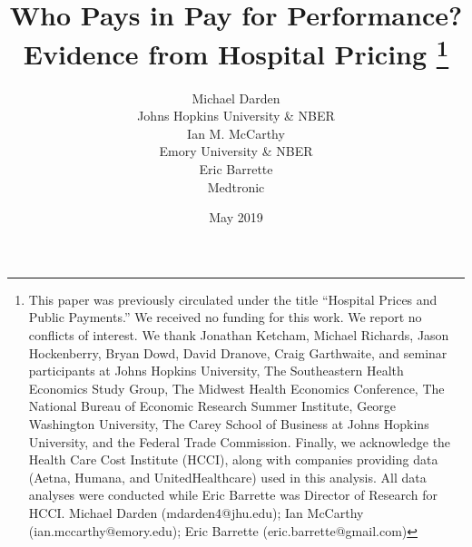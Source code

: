 \documentclass[12pt]{article}
\begin{document}
\title{Who Pays in Pay for Performance? Evidence from Hospital Pricing \thanks{This paper was previously circulated under the title ``Hospital Prices and Public Payments.''  We received no funding for this work.  We report no conflicts of interest. We thank Jonathan Ketcham, Michael Richards, Jason Hockenberry, Bryan Dowd, David Dranove, Craig Garthwaite, and seminar participants at Johns Hopkins University, The Southeastern Health Economics Study Group, The Midwest Health Economics Conference, The National Bureau of Economic Research Summer Institute, George Washington University, The Carey School of Business at Johns Hopkins University, and the Federal Trade Commission. Finally, we acknowledge the Health Care Cost Institute (HCCI), along with companies providing data (Aetna, Humana, and UnitedHealthcare) used in this analysis.  All data analyses were conducted while Eric Barrette was Director of Research for HCCI. Michael Darden (mdarden4@jhu.edu); Ian McCarthy (ian.mccarthy@emory.edu); Eric Barrette (eric.barrette@gmail.com)}}
\author{%
  Michael Darden \\[-0.5ex]
  Johns Hopkins University \& NBER \\
  Ian M. McCarthy \\[-0.5ex]
  Emory University \& NBER \\
  Eric Barrette \\[-0.5ex]
  Medtronic
}
\date{May 2019}

\maketitle
\end{document}
